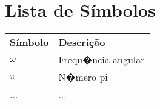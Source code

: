 \chapter*{Lista de Símbolos} 

\begin{longtable}[l]{l l} 
   \textbf{Símbolo}	& \textbf{Descrição} \\
   
   $\omega$ & Frequ�ncia angular \\
   $\pi$ &  N�mero pi\\
   ... & ... \\ 
\end{longtable}
